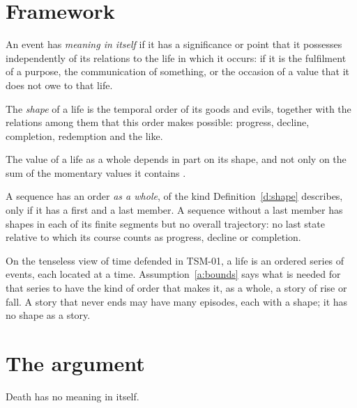 \documentclass{situationist-preprint}
\begin{document}
\section{Framework}

\begin{definition}\label{d:itself}
An event has \emph{meaning in itself} if it has a significance or point that it possesses independently of its relations to the life in which it occurs: if it is the fulfilment of a purpose, the communication of something, or the occasion of a value that it does not owe to that life.
\end{definition}

\begin{definition}[Shape]\label{d:shape}
The \emph{shape} of a life is the temporal order of its goods and evils, together with the relations among them that this order makes possible: progress, decline, completion, redemption and the like.
\end{definition}

\begin{principle}\label{p:shape}
The value of a life as a whole depends in part on its shape, and not only on the sum of the momentary values it contains \citep{Velleman1991}.
\end{principle}

\begin{assumption}[Bounds]\label{a:bounds}
A sequence has an order \emph{as a whole}, of the kind Definition~\ref{d:shape} describes, only if it has a first and a last member. A sequence without a last member has shapes in each of its finite segments but no overall trajectory: no last state relative to which its course counts as progress, decline or completion.
\end{assumption}

On the tenseless view of time defended in TSM-01, a life is an ordered series of events, each located at a time. Assumption~\ref{a:bounds} says what is needed for that series to have the kind of order that makes it, as a whole, a story of rise or fall. A story that never ends may have many episodes, each with a shape; it has no shape as a story.

\section{The argument}

\begin{proposition}\label{p:noitself}
Death has no meaning in itself.
\end{proposition}
\end{document}
